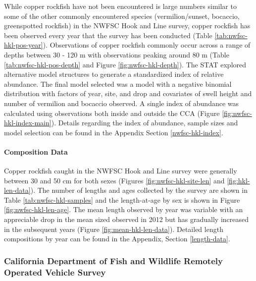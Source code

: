 \documentclass[11pt,
  english,
  letterpaper,
]{article}
\begin{document}
While copper rockfish have not been encountered is large numbers similar to some of the other commonly encountered species (vermilion/sunset, bocaccio, greenspotted rockfish) in the NWFSC Hook and Line survey, copper rockfish has been observed every year that the survey has been conducted (Table \ref{tab:nwfsc-hkl-pos-year}). Observations of copper rockfish commonly occur across a range of depths between 30 - 120 m with observations peaking around 80 m (Table \ref{tab:nwfsc-hkl-pos-depth} and Figure \ref{fig:nwfsc-hkl-depth}). The STAT explored alternative model structures to generate a standardized index of relative abundance. The final model selected was a model with a negative binomial distribution with factors of year, site, and drop and covariates of swell height and number of vermilion and bocaccio observed. A single index of abundance was calculated using observations both inside and outside the CCA (Figure \ref{fig:nwfsc-hkl-index-main}). Details regarding the index of abundance, sample sizes and model selection can be found in the Appendix Section \ref{nwfsc-hkl-index}.

\hypertarget{composition-data-3}{%
\paragraph{Composition Data}\label{composition-data-3}}

\hfill\break

Copper rockfish caught in the NWFSC Hook and Line survey were generally between 30 and 50 cm for both sexes (Figures \ref{fig:nwfsc-hkl-site-len} and \ref{fig:hkl-len-data}). The number of lengths and ages collected by the survey are shown in Table \ref{tab:nwfsc-hkl-samples} and the length-at-age by sex is shown in Figure \ref{fig:nwfsc-hkl-len-age}. The mean length observed by year was variable with an appreciable drop in the mean sized observed in 2012 but has gradually increased in the subsequent years (Figure \ref{fig:mean-hkl-len-data}). Detailed length compositions by year can be found in the Appendix, Section \ref{length-data}.

\hypertarget{california-department-of-fish-and-wildlife-remotely-operated-vehicle-survey}{%
\subsubsection{California Department of Fish and Wildlife Remotely Operated Vehicle Survey}\label{california-department-of-fish-and-wildlife-remotely-operated-vehicle-survey}}
\end{document}
